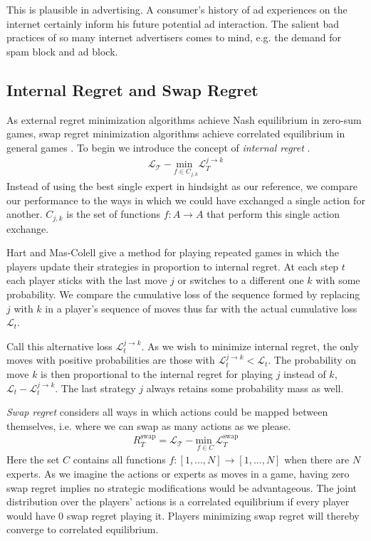 \documentclass{article}
\begin{document}
This is plausible in advertising. A consumer's history of ad experiences on the internet certainly inform his future potential ad interaction. The salient bad practices of so many internet advertisers comes to mind, e.g. the demand for spam block and ad block. 

\subsection{Internal Regret and Swap Regret}

As external regret minimization algorithms achieve Nash equilibrium in zero-sum games, swap regret minimization algorithms achieve correlated equilibrium in general games \cite{blum2007external}. To begin we introduce the concept of \emph{internal regret} \cite{foster1998asymptotic}. 
\begin{align*}
\mathcal{L_T} - \underset{f \in C_{j,k}}{\text{min }}\mathcal{L}_T^{j\rightarrow k}
\end{align*}
Instead of using the best single expert in hindsight as our reference, we compare our performance to the ways in which we could have exchanged a single action for another. $C_{j,k}$ is the set of functions $f: A \rightarrow A$ that perform this single action exchange.

Hart and Mas-Colell\cite{hart2000simple} give a method for playing repeated games in which the players update their strategies in proportion to internal regret. At each step $t$ each player sticks with the last move $j$ or switches to a different one $k$ with some probability. We compare the cumulative loss of the sequence formed by replacing $j$ with $k$ in a player's sequence of moves thus far with the actual cumulative loss $\mathcal{L}_t$.

Call this alternative loss $\mathcal{L}_t^{j\rightarrow k}$. As we wish to minimize internal regret, the only moves with positive probabilities are those with $\mathcal{L}_t^{j\rightarrow k} < \mathcal{L}_t$. The probability on move $k$ is then proportional to the internal regret for playing $j$ instead of $k$, $\mathcal{L}_t - \mathcal{L}_t^{j\rightarrow k}$. The last strategy $j$ always retains some probability mass as well.

\emph{Swap regret} considers all ways in which actions could be mapped between themselves, i.e. where we can swap as many actions as we please.
\begin{align*}
R_T^{\text{swap}} = \mathcal{L_T} - \underset{f \in C}{\text{min }}\mathcal{L}_T^{\text{swap}}\end{align*}
Here the set $C$ contains all functions $f: [1,...,N] \rightarrow [1,...,N]$ when there are $N$ experts. As we imagine the actions or experts as moves in a game, having zero swap regret implies no strategic modifications would be advantageous. The joint distribution over the players' actions is a correlated equilibrium if every player would have 0 swap regret playing it. Players minimizing swap regret will thereby converge to correlated equilibrium.
\end{document}
